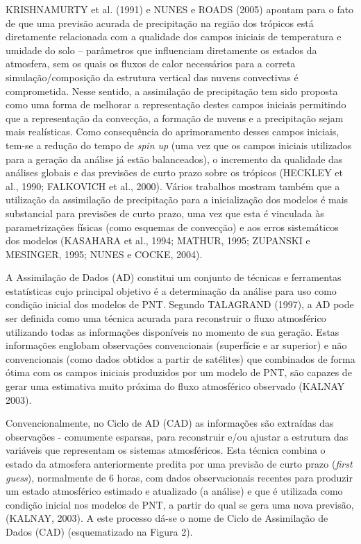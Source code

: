 KRISHNAMURTY et al. (1991) e NUNES e ROADS (2005) apontam para o fato de que uma previsão acurada de precipitação na região dos trópicos está diretamente relacionada com a qualidade dos campos iniciais de temperatura e umidade do solo – parâmetros que influenciam diretamente os estados da atmosfera, sem os quais os fluxos de calor necessários para a correta simulação/composição da estrutura vertical das nuvens convectivas é comprometida. Nesse sentido, a assimilação de precipitação tem sido proposta como uma forma de melhorar a representação destes campos iniciais permitindo que a representação da convecção, a formação de nuvens e a precipitação sejam mais realísticas. Como consequência do aprimoramento desses campos iniciais, tem-se a redução do tempo de \textit{spin up} (uma vez que os campos iniciais utilizados para a geração da análise já estão balanceados), o incremento da qualidade das análises globais e das previsões de curto prazo sobre os trópicos (HECKLEY et al., 1990; FALKOVICH et al., 2000). Vários trabalhos mostram também que a utilização da assimilação de precipitação para a inicialização dos modelos é mais substancial para previsões de curto prazo, uma vez que esta é vinculada às parametrizações físicas (como esquemas de convecção) e aos erros sistemáticos dos modelos (KASAHARA et al., 1994; MATHUR, 1995; ZUPANSKI e MESINGER, 1995; NUNES e COCKE, 2004).

A Assimilação de Dados (AD) constitui um conjunto de técnicas e ferramentas estatísticas cujo principal objetivo é a determinação da análise para uso como condição inicial dos modelos de PNT. Segundo TALAGRAND (1997), a AD pode ser definida como uma técnica acurada para reconstruir o fluxo atmosférico utilizando todas as informações disponíveis no momento de sua geração. Estas informações englobam observações convencionais (superfície e ar superior) e não convencionais (como dados obtidos a partir de satélites) que combinados de forma ótima com os campos iniciais produzidos por um modelo de PNT, são capazes de gerar uma estimativa muito próxima do fluxo atmosférico observado (KALNAY 2003).

Convencionalmente, no Ciclo de AD (CAD) as informações são extraídas das observações - comumente esparsas, para reconstruir e/ou ajustar a estrutura das variáveis que representam os sistemas atmosféricos. Esta técnica combina o estado da atmosfera anteriormente predita por uma previsão de curto prazo (\textit{first guess}), normalmente de 6 horas, com dados observacionais recentes para produzir um estado atmosférico estimado e atualizado (a análise) e que é utilizada como condição inicial nos modelos de PNT, a partir do qual se gera uma nova previsão, (KALNAY, 2003). A este processo dá-se o nome de Ciclo de Assimilação de Dados (CAD) (esquematizado na Figura 2).

